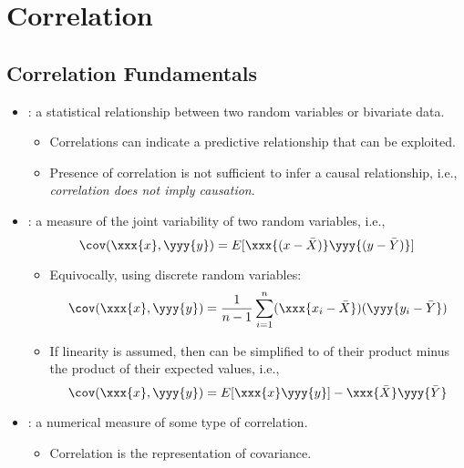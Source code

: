 \chapter{Correlation}

\section{Correlation Fundamentals}
\begin{itemize}
  \item {}: a statistical relationship between two random variables or bivariate data.
    \begin{itemize}
      \item Correlations can indicate a predictive relationship that can be exploited. 
      \item Presence of correlation is not sufficient to infer a causal relationship, i.e., \emph{correlation does not imply causation}.
    \end{itemize}
  \item {}: a measure of the joint variability of two random variables, i.e.,
  \[%
  \cov(\xxx{x},\yyy{y}) =  E[\xxx{(x-\bar{X})}\yyy{(y-\bar{Y})}]
  \]%
    \begin{itemize}
      \item Equivocally, using discrete random variables:
      \[%
      \cov(\xxx{x},\yyy{y})= \frac{1}{n-1}\sum_{i = 1}^{n}(\xxx{x_i-\bar{X}})(\yyy{y_i-\bar{Y}})
      \]%
      \item If linearity is assumed, then can be simplified to \hyperref[Section: Sampling]{} of their product minus the product of their expected values, i.e.,
      \[%
      \cov(\xxx{x},\yyy{y}) = E[\xxx{x}\yyy{y}] - \xxx{\bar{X}}\yyy{\bar{Y}}
      \]%
    \end{itemize}
  \item {}: a numerical measure of some type of correlation. 
    \begin{itemize}
      \item Correlation is the \hyperref[Section: Introduction to Normalization]{} representation of covariance.

\end{itemize}
\end{itemize}
